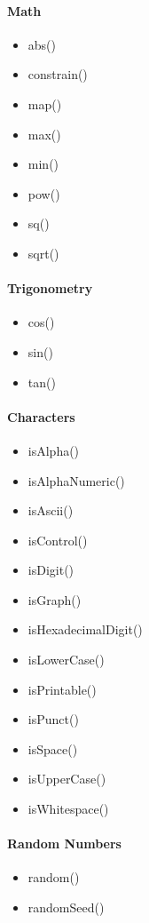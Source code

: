 \documentclass[../informe_krapp.tex]{subfiles}
\begin{document}
\begin{multicols}{2}
	\paragraph{Math}
	\begin{itemize}
		\item abs()
		\item constrain()
		\item map()
		\item max()
		\item min()
		\item pow()
		\item sq()
		\item sqrt()
	\end{itemize}

	\paragraph{Trigonometry}
	\begin{itemize}
		\item cos()
		\item sin()
		\item tan()
	\end{itemize}

	\paragraph{Characters}
	\begin{itemize}
		\item isAlpha()
		\item isAlphaNumeric()
		\item isAscii()
		\item isControl()
		\item isDigit()
		\item isGraph()
		\item isHexadecimalDigit()
		\item isLowerCase()
		\item isPrintable()
		\item isPunct()
		\item isSpace()
		\item isUpperCase()
		\item isWhitespace()
	\end{itemize}

	\paragraph{Random Numbers}
	\begin{itemize}
		\item random()
		\item randomSeed()
	\end{itemize}


\end{multicols}
\end{document}
